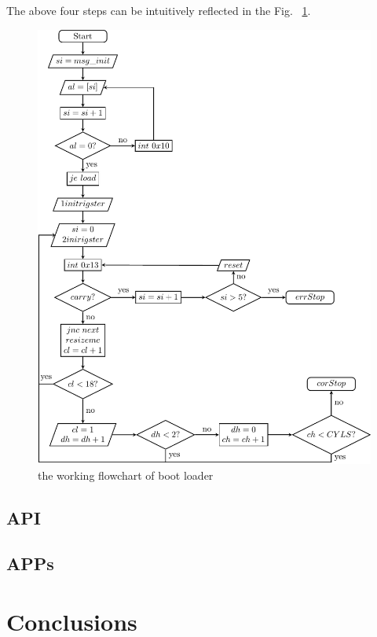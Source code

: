 \documentclass{swfcthesis}
\begin{document}
The above four steps can be intuitively reflected in the Fig. ~\ref{fig:iplflowchart}.
\begin{figure}[!htbp]
  \centering
  \includegraphics[width=1\textwidth]{flowchartp}
  \caption{the working flowchart of boot loader}
  \label{fig:iplflowchart}
\end{figure}

\section{API}
\label{sec:API}


\section{APPs}
\label{sec:apps}




\chapter{Conclusions}%
\end{document}
